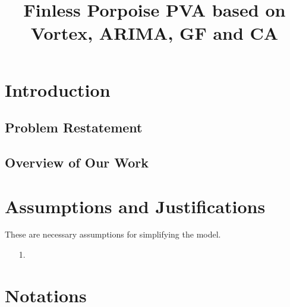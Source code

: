 \documentclass{mcmthesis}
\title{Finless Porpoise PVA based on Vortex, ARIMA, GF and CA}
\numberwithin{figure}{section}
\numberwithin{table}{section}
\numberwithin{equation}{section}
\begin{document}
\renewcommand{\algorithmicrequire}{\textbf{Input:}}  %
\renewcommand{\algorithmicensure}{\textbf{Output:}} %

\begin{abstract}



\begin{keywords}
\end{keywords}
\end{abstract}
\maketitle

\tableofcontents
  \thispagestyle{empty}
  \newpage
  \setcounter{page}{1}

\section{Introduction}

\subsection{Problem Restatement}



\subsection{Overview of Our Work}

\newpage



\section{Assumptions and Justifications}
These are necessary assumptions for simplifying the model.
\begin{enumerate}
  \item [1.] 
\end{enumerate}


\section{Notations}
\end{document}
